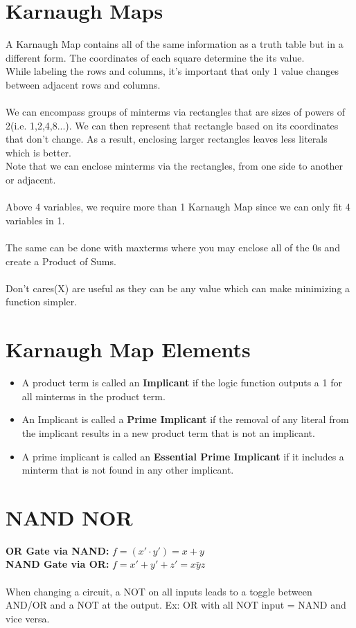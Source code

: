 \documentclass[12pt]{report}
\begin{document}
	\section{Karnaugh Maps}
		A Karnaugh Map contains all of the same information as a truth table but in a different form. The coordinates of each square determine the its value.\\
		While labeling the rows and columns, it's important that only 1 value changes between adjacent rows and columns.\\
		\\
		We can encompass groups of minterms via rectangles that are sizes of powers of 2(i.e. 1,2,4,8...). We can then represent that rectangle based on its coordinates that don't change. As a result, enclosing larger rectangles leaves less literals which is better.
		\\
		Note that we can enclose minterms via the rectangles, from one side to another or adjacent.
		\\
		\\
		Above 4 variables, we require more than 1 Karnaugh Map since we can only fit 4 variables in 1.
		\\
		\\
		The same can be done with maxterms where you may enclose all of the 0s and create a Product of Sums.
		\\
		\\
		Don't cares(X) are useful as they can be any value which can make minimizing a function simpler.
	\section{Karnaugh Map Elements}
		\begin{itemize}
			\item A product term is called an \textbf{Implicant} if the logic function outputs a 1 for all minterms in the product term.
			\item An Implicant is called a \textbf{Prime Implicant} if the removal of any literal from the implicant results in a new product term that is not an implicant.
			\item A prime implicant is called an \textbf{Essential Prime Implicant} if it includes a minterm that is not found in any other implicant. 
		\end{itemize}
	\section{NAND NOR}
		\textbf{OR Gate via NAND:} $f = (x' \cdot y') = x+y$\\
		\textbf{NAND Gate via OR:} $f = x' + y' + z' = \bar{xyz}$\\
		\\
		When changing a circuit, a NOT on all inputs leads to a toggle between AND/OR and a NOT at the output. Ex: OR with all NOT input = NAND and vice versa.
\end{document}
